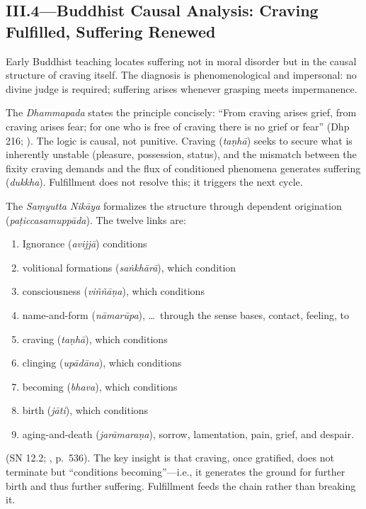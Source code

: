 \subsection*{III.4—Buddhist Causal Analysis: Craving Fulfilled, Suffering Renewed}
\label{ssec:iii-buddhist-causal-analysis}

Early Buddhist teaching locates suffering not in moral disorder but in the causal structure of
craving itself. The diagnosis is phenomenological and impersonal: no divine judge is required;
suffering arises whenever grasping meets impermanence.

The \emph{Dhammapada} states the principle concisely: ``From craving arises grief, from
craving arises fear; for one who is free of craving there is no grief or fear'' (Dhp 216;
\parencite{BuddharakkhitaDhp1993}). The logic is causal, not punitive. Craving (\emph{taṇhā})
seeks to secure what is inherently unstable (pleasure, possession, status), and the mismatch
between the fixity craving demands and the flux of conditioned phenomena generates suffering
(\emph{dukkha}). Fulfillment does not resolve this; it triggers the next cycle.

The \emph{Saṃyutta Nikāya} formalizes the structure through dependent origination
(\emph{paṭiccasamuppāda}). The twelve links are:
\begin{enumerate}
	\item Ignorance (\emph{avijjā}) conditions
	\item volitional formations (\emph{saṅkhārā}), which condition
	\item consciousness (\emph{viññāṇa}), which conditions
	\item name-and-form (\emph{nāmarūpa}), \ldots\ through the sense bases, contact, feeling, to
	\item craving (\emph{taṇhā}), which conditions
	\item clinging (\emph{upādāna}), which conditions
	\item becoming (\emph{bhava}), which conditions
	\item birth (\emph{jāti}), which conditions
	\item aging-and-death (\emph{jarāmaraṇa}), sorrow, lamentation, pain, grief, and despair.
\end{enumerate}
(SN 12.2; \parencite{BodhiSN2000}, p.~536). The key insight is that craving, once gratified,
does not terminate but ``conditions becoming''---i.e., it generates the ground for further
birth and thus further suffering. Fulfillment feeds the chain rather than breaking it.

